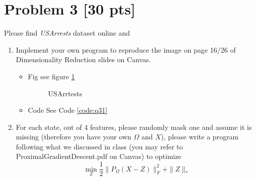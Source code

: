\documentclass[11pt]{article}
\newcommand{\mfile}[1]  {{\small }} %
\begin{document}
\section*{Problem 3 [30 pts]}
Please find \textit{USArrests} dataset online and 
\begin{enumerate}
	\item Implement your own program to reproduce the image on page 16/26 of  Dimensionality Reduction slides on Canvas.
	\begin{itemize}
		\item Fig see figure \ref{fig:q31}
		\begin{figure}
			\centering
			\caption{USArrtests}
			\label{fig:q31}
		  \end{figure} 
		\item Code
		See Code \ref{code:q31}
		\mfile{Q3_1.py}\label{code:q31}
	\end{itemize}
	
	\item For each state, out of 4 features, please randomly mask one and assume it is missing (therefore you have your own $\Omega$ and $X$), please write a program following what we discussed in class (you may refer to ProximalGradientDescent.pdf on Canvas) to optimize  
		\begin{equation}
		\min_{Z} \frac{1}{2}\|P_\Omega(X-Z)\|_F^2+\|Z\|_*
	\end{equation}
\end{enumerate}


\newpage
\end{document}
